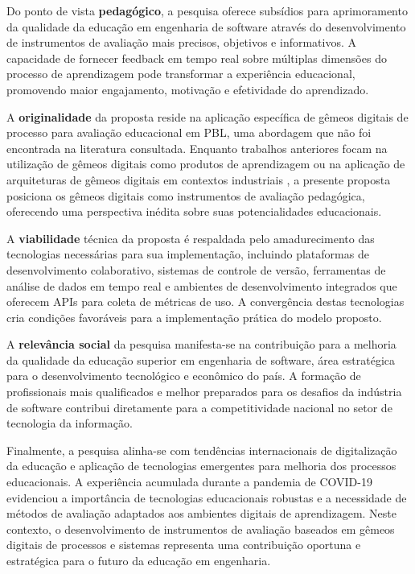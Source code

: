 \documentclass[12pt,a4paper]{article}
\renewcommand{\cite}[1]{}
\begin{document}
Do ponto de vista \textbf{pedagógico}, a pesquisa oferece subsídios para
aprimoramento da qualidade da educação em engenharia de software através do
desenvolvimento de instrumentos de avaliação mais precisos, objetivos e
informativos. A capacidade de fornecer feedback em tempo real sobre múltiplas
dimensões do processo de aprendizagem pode transformar a experiência
educacional, promovendo maior engajamento, motivação e efetividade do
aprendizado.

A \textbf{originalidade} da proposta reside na aplicação específica de gêmeos
digitais de processo para avaliação educacional em PBL, uma abordagem que não
foi encontrada na literatura consultada. Enquanto trabalhos anteriores focam na
utilização de gêmeos digitais como produtos de aprendizagem \cite{bachmann2023}
ou na aplicação de arquiteturas de gêmeos digitais em contextos industriais
\cite{arakaki2022}, a presente proposta posiciona os gêmeos digitais como
instrumentos de avaliação pedagógica, oferecendo uma perspectiva inédita sobre
suas potencialidades educacionais.

A \textbf{viabilidade} técnica da proposta é respaldada pelo amadurecimento das
tecnologias necessárias para sua implementação, incluindo plataformas de
desenvolvimento colaborativo, sistemas de controle de versão, ferramentas de
análise de dados em tempo real e ambientes de desenvolvimento integrados que
oferecem APIs para coleta de métricas de uso. A convergência destas tecnologias
cria condições favoráveis para a implementação prática do modelo proposto.

A \textbf{relevância social} da pesquisa manifesta-se na contribuição para a
melhoria da qualidade da educação superior em engenharia de software, área
estratégica para o desenvolvimento tecnológico e econômico do país. A formação
de profissionais mais qualificados e melhor preparados para os desafios da
indústria de software contribui diretamente para a competitividade nacional no
setor de tecnologia da informação.

Finalmente, a pesquisa alinha-se com tendências internacionais de digitalização
da educação e aplicação de tecnologias emergentes para melhoria dos processos
educacionais. A experiência acumulada durante a pandemia de COVID-19 evidenciou
a importância de tecnologias educacionais robustas e a necessidade de métodos
de avaliação adaptados aos ambientes digitais de aprendizagem. Neste contexto,
o desenvolvimento de instrumentos de avaliação baseados em gêmeos digitais de
processos e sistemas representa uma contribuição oportuna e estratégica para o
futuro da educação em engenharia.
\end{document}

